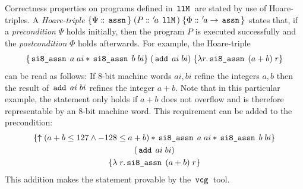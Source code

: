 Correctness properties on programs defined in $\,\text{\ttfamily llM}\,$ are stated by use of Hoare-triples.
A \textit{Hoare-triple} $\{\Psi \mathrel{\mathord{:}\mkern-1.2mu\mathord{:}} \,\text{\ttfamily assn}\,\} \; (P \mathrel{\mathord{:}\mkern-1.2mu\mathord{:}} {\mskip2mu '\mskip-2mua} \; \,\text{\ttfamily llM}\,) \; \{\Phi \mathrel{\mathord{:}\mkern-1.2mu\mathord{:}} {\mskip2mu '\mskip-2mua} \rightarrow \,\text{\ttfamily assn}\,\}$ states that, if a \textit{precondition} $\Psi$ holds initially, then the program $P$ is executed successfully and the \textit{postcondition} $\Phi$ holds afterwards.
For example, the Hoare-triple
$$
	\{\,\text{\ttfamily si8\_assn}\, \; a \; ai \ast \,\text{\ttfamily si8\_assn}\, \; b \; bi\}
	\; (\,\text{\ttfamily add}\, \; ai \; bi) \;
	\{\lambda r. \,\text{\ttfamily si8\_assn}\, \; (a + b) \; r\}
$$
can be read as follows:
If 8-bit machine words $ai, bi$ refine the integers $a, b$ then the result of $\,\text{\ttfamily add}\, \; ai \; bi$ refines the integer $a + b$.
Note that in this particular example, the statement only holds if $a + b$ does not overflow and is therefore representable by an 8-bit machine word.
This requirement can be added to the precondition:
\begin{gather*}
	\{\uparrow(a + b \le 127 \land -128 \le a + b) \ast \,\text{\ttfamily si8\_assn}\, \; a \; ai \ast \,\text{\ttfamily si8\_assn}\, \; b \; bi\} \\
	(\,\text{\ttfamily add}\, \; ai \; bi) \\
	\{\lambda \; r. \,\text{\ttfamily si8\_assn}\, \; (a + b) \; r\}
\end{gather*}
This addition makes the statement provable by the $\,\text{\ttfamily vcg}\,$ tool.

